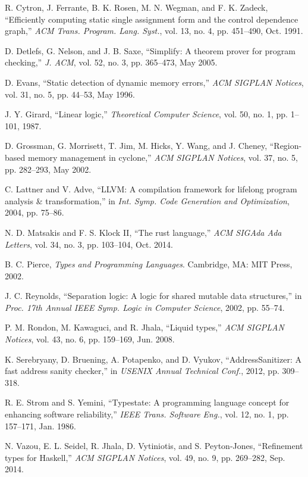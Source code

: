 \documentclass[journal]{IEEEtran}
\begin{document}
\begin{thebibliography}{00}

 R. Cytron, J. Ferrante, B. K. Rosen, M. N. Wegman, and F. K. Zadeck, ``Efficiently computing static single assignment form and the control dependence graph,'' \emph{ACM Trans. Program. Lang. Syst.}, vol. 13, no. 4, pp. 451--490, Oct. 1991.

 D. Detlefs, G. Nelson, and J. B. Saxe, ``Simplify: A theorem prover for program checking,'' \emph{J. ACM}, vol. 52, no. 3, pp. 365--473, May 2005.

 D. Evans, ``Static detection of dynamic memory errors,'' \emph{ACM SIGPLAN Notices}, vol. 31, no. 5, pp. 44--53, May 1996.

 J. Y. Girard, ``Linear logic,'' \emph{Theoretical Computer Science}, vol. 50, no. 1, pp. 1--101, 1987.

 D. Grossman, G. Morrisett, T. Jim, M. Hicks, Y. Wang, and J. Cheney, ``Region-based memory management in cyclone,'' \emph{ACM SIGPLAN Notices}, vol. 37, no. 5, pp. 282--293, May 2002.

 C. Lattner and V. Adve, ``LLVM: A compilation framework for lifelong program analysis \& transformation,'' in \emph{Int. Symp. Code Generation and Optimization}, 2004, pp. 75--86.

 N. D. Matsakis and F. S. Klock II, ``The rust language,'' \emph{ACM SIGAda Ada Letters}, vol. 34, no. 3, pp. 103--104, Oct. 2014.

 B. C. Pierce, \emph{Types and Programming Languages}. Cambridge, MA: MIT Press, 2002.

 J. C. Reynolds, ``Separation logic: A logic for shared mutable data structures,'' in \emph{Proc. 17th Annual IEEE Symp. Logic in Computer Science}, 2002, pp. 55--74.

 P. M. Rondon, M. Kawaguci, and R. Jhala, ``Liquid types,'' \emph{ACM SIGPLAN Notices}, vol. 43, no. 6, pp. 159--169, Jun. 2008.

 K. Serebryany, D. Bruening, A. Potapenko, and D. Vyukov, ``AddressSanitizer: A fast address sanity checker,'' in \emph{USENIX Annual Technical Conf.}, 2012, pp. 309--318.

 R. E. Strom and S. Yemini, ``Typestate: A programming language concept for enhancing software reliability,'' \emph{IEEE Trans. Software Eng.}, vol. 12, no. 1, pp. 157--171, Jan. 1986.

 N. Vazou, E. L. Seidel, R. Jhala, D. Vytiniotis, and S. Peyton-Jones, ``Refinement types for Haskell,'' \emph{ACM SIGPLAN Notices}, vol. 49, no. 9, pp. 269--282, Sep. 2014.

\end{thebibliography}

\balance
\end{document}
